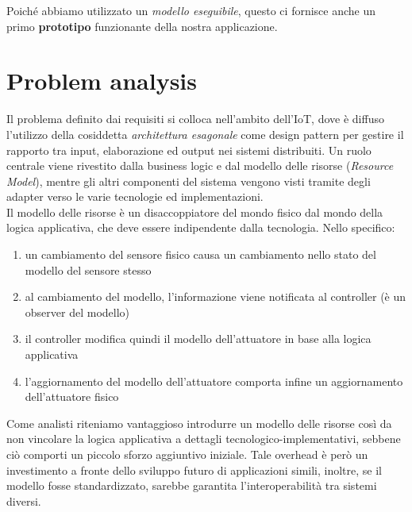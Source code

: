 \documentclass{../llncs}
\newcommand{\labelsec}[1]{\label{sec:#1}}
\begin{document}


\vspace{8px}



\vspace{8px}

Poiché abbiamo utilizzato un \emph{modello eseguibile}, questo ci fornisce anche un primo \textbf{prototipo} funzionante della nostra applicazione.

\section{Problem analysis}
\labelsec{ProblemAnalysis}
Il problema definito dai requisiti si colloca nell'ambito dell'IoT, dove è diffuso l'utilizzo della cosiddetta \emph{architettura esagonale} come design pattern per gestire il rapporto tra input, elaborazione ed output nei sistemi distribuiti. Un ruolo centrale viene rivestito dalla business logic e dal modello delle risorse (\emph{Resource Model}), mentre gli altri componenti del sistema vengono visti tramite degli adapter verso le varie tecnologie ed implementazioni.\\

Il modello delle risorse è un disaccoppiatore del mondo fisico dal mondo della logica applicativa, che deve essere indipendente dalla tecnologia. Nello specifico:
\begin{enumerate}
\item un cambiamento del sensore fisico causa un cambiamento nello stato del modello del sensore stesso
\item al cambiamento del modello, l'informazione viene notificata al controller (è un observer del modello)
\item il controller modifica quindi il modello dell'attuatore in base alla logica applicativa
\item l'aggiornamento del modello dell'attuatore comporta infine un aggiornamento dell'attuatore fisico
\end{enumerate}

Come analisti riteniamo vantaggioso introdurre un modello delle risorse così da non vincolare la logica applicativa a dettagli tecnologico-implementativi, sebbene ciò comporti un piccolo sforzo aggiuntivo iniziale. Tale overhead è però un investimento a fronte dello sviluppo futuro di applicazioni simili, inoltre, se il modello fosse standardizzato, sarebbe garantita l'interoperabilità tra sistemi diversi.
\end{document}
